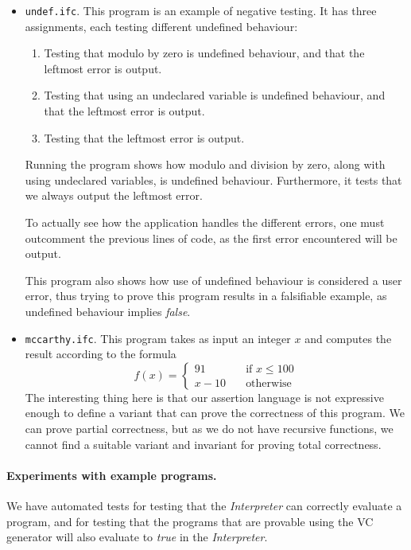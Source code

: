 \begin{itemize}
  \item{\texttt{undef.ifc}.}
	This program is an example of negative testing.
  It has three assignments, each testing different undefined behaviour:
	\begin{enumerate}
		\item Testing that modulo by zero is undefined behaviour, and that the leftmost error is output.
		\item Testing that using an undeclared variable is undefined behaviour, and that the leftmost error is output.
		\item Testing that the leftmost error is output.
	\end{enumerate}
  Running the program shows how modulo and division by zero, along with using undeclared variables, is undefined behaviour.
	Furthermore, it tests that we always output the leftmost error.

	To actually see how the application handles the different errors, one must outcomment the previous lines of code, as the first error encountered will be output.

	This program also shows how use of undefined behaviour is considered a user error, thus trying to prove this program results in a falsifiable example, as undefined behaviour implies \textit{false}.

  \item{\texttt{mccarthy.ifc}.}
	This program takes as input an integer $x$ and computes the result according to the formula
	\[ f(x) =
	  \begin{cases}
	    91       & \quad \text{if } x \leq 100 \\
	    x - 10   & \quad \text{otherwise}
	  \end{cases}
	\]
	The interesting thing here is that our assertion language is not expressive enough to define a variant that can prove the correctness of this program. 
	We can prove partial correctness, but as we do not have recursive functions, we cannot find a suitable variant and invariant for proving total correctness.
\end{itemize}

\paragraph{Experiments with example programs.}
We have automated tests for testing that the \textit{Interpreter} can correctly evaluate a program,
and for testing that the programs that are provable using the VC generator will also evaluate to \textit{true} in the \textit{Interpreter}.

